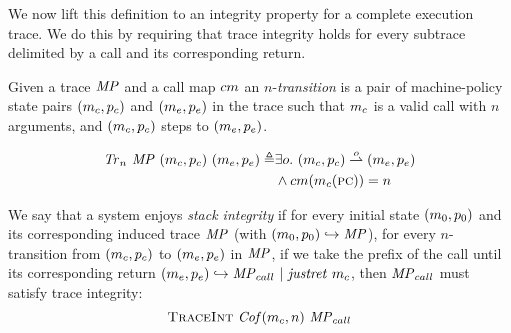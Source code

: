\documentclass[acmsmall,review,anonymous]{acmart}\settopmatter{printfolios=true,printccs=false,printacmref=false}
\begin{document}
{We now lift this definition to an integrity property for a complete
execution trace. We do this by requiring that trace integrity holds
for every subtrace delimited by a call and its corresponding return.

 Given a trace \(\mathit{MP}\) and a call map \(cm\)
an \(n\)-{\em transition} is a pair of
machine-policy state pairs \((m_c,p_c)\) and
\((m_e,p_e)\) in the trace such that
\(m_c\) is a valid call with \(n\) arguments, and
\((m_c,p_c)\) steps to \((m_e,p_e)\).


  \[\begin{split}
    \mathit{Tr}_n ~ \mathit{MP} ~ (m_c,p_c) ~ (m_e,p_e)
    \triangleq & \exists o.
    ~ (m_c,p_c) \overset{o}{\rightharpoonup} (m_e,p_e) \\
    & \land cm(m_c(\textsc{pc})) = n
  \end{split}\]


We say that a system enjoys {\em stack integrity} if for every initial
state $(m_0,p_0)$ and its corresponding induced trace $\mathit{MP}$ (with
$(m_0,p_0) \hookrightarrow \mathit{MP}$), for every
$n$-transition from $(m_c,p_c)$ to
$(m_e,p_e)$ in $\mathit{MP}$, if we take the prefix of the
call until its corresponding return $(m_e,p_e)
\hookrightarrow \mathit{MP}_{call} ~ | ~ \mathit{justret}\ m_c$, then $\mathit{MP}_{call}$ must
satisfy trace integrity:
\[\text{\sc TraceInt} ~ \mathit{Cof}(m_c,n) ~ \mathit{MP}_{call}\]


%

}
\end{document}
